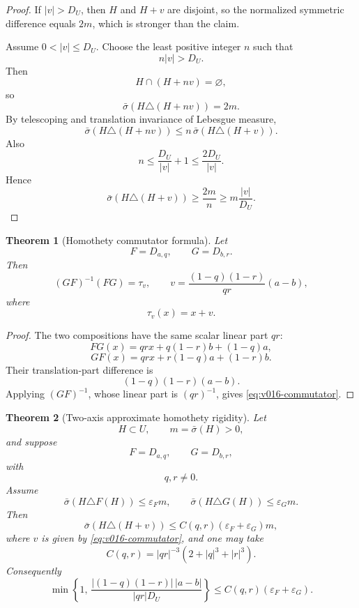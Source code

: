 \documentclass[10pt]{article}
\newtheorem{theorem}{Theorem}[section]
\begin{document}
\begin{proof}
If \(|v|>D_U\), then \(H\) and \(H+v\) are disjoint, so the normalized symmetric difference equals
\(2m\), which is stronger than the claim.

Assume \(0<|v|\le D_U\).  Choose the least positive integer \(n\) such that
\[
n|v|>D_U.
\]
Then
\[
H\cap(H+nv)=\varnothing,
\]
so
\[
\bar\sigma
\left(
H\triangle(H+nv)
\right)
=
2m.
\]
By telescoping and translation invariance of Lebesgue measure,
\[
\bar\sigma
\left(
H\triangle(H+nv)
\right)
\le
n\,
\bar\sigma
\left(
H\triangle(H+v)
\right).
\]
Also
\[
n
\le
\frac{D_U}{|v|}+1
\le
\frac{2D_U}{|v|}.
\]
Hence
\[
\bar\sigma
\left(
H\triangle(H+v)
\right)
\ge
\frac{2m}{n}
\ge
m\frac{|v|}{D_U}.
\]
\end{proof}

\begin{theorem}[Homothety commutator formula]
\label{thm:v016-commutator}
Let
\[
F=D_{a,q},
\qquad
G=D_{b,r}.
\]
Then
\begin{equation}
\label{eq:v016-commutator}
\boxed{
(GF)^{-1}(FG)
=
\tau_v,
\qquad
v
=
\frac{(1-q)(1-r)}{qr}(a-b),
}
\end{equation}
where
\[
\tau_v(x)=x+v.
\]
\end{theorem}

\begin{proof}
The two compositions have the same scalar linear part \(qr\):
\[
FG(x)
=
qrx
+
q(1-r)b
+
(1-q)a,
\]
\[
GF(x)
=
qrx
+
r(1-q)a
+
(1-r)b.
\]
Their translation-part difference is
\[
(1-q)(1-r)(a-b).
\]
Applying \((GF)^{-1}\), whose linear part is \((qr)^{-1}\), gives
\eqref{eq:v016-commutator}.
\end{proof}

\begin{theorem}[Two-axis approximate homothety rigidity]
\label{thm:v016-two-axis}
Let
\[
H\subset U,
\qquad
m=\bar\sigma(H)>0,
\]
and suppose
\[
F=D_{a,q},
\qquad
G=D_{b,r},
\]
with
\[
q,r\ne0.
\]
Assume
\begin{equation}
\label{eq:v016-two-axis-defects}
\boxed{
\bar\sigma(H\triangle F(H))
\le
\varepsilon_Fm,
\qquad
\bar\sigma(H\triangle G(H))
\le
\varepsilon_Gm.
}
\end{equation}
Then
\begin{equation}
\label{eq:v016-commutator-defect}
\boxed{
\bar\sigma
\left(
H\triangle(H+v)
\right)
\le
C(q,r)
(\varepsilon_F+\varepsilon_G)m,
}
\end{equation}
where \(v\) is given by
\eqref{eq:v016-commutator}, and one may take
\[
C(q,r)
=
|qr|^{-3}
\left(
2+|q|^3+|r|^3
\right).
\]
Consequently
\begin{equation}
\label{eq:v016-center-rigidity-general}
\boxed{
\min
\left\{
1,\,
\frac{
|(1-q)(1-r)|\,|a-b|
}{
|qr|D_U
}
\right\}
\le
C(q,r)
(\varepsilon_F+\varepsilon_G).
}
\end{equation}
\end{theorem}
\end{document}

